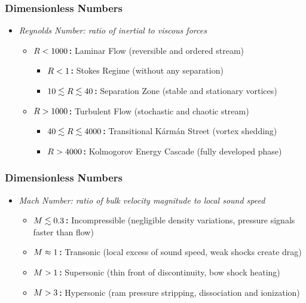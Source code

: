 	\begin{frame}
		\frametitle{Dimensionless Numbers}
		\begin{itemize}
			\item<2-> \itshape{Reynolds Number:} ratio of inertial to viscous forces
					  \visible<3->{$$R = \frac{\rho u L}{\eta} = \frac{u L}{\nu}$$\\[-1ex]}
			\begin{itemize}
				\item<3-> $R < 1000\kern+1pt${\bfseries{:}} Laminar Flow (reversible and ordered stream)
				\begin{itemize}
					\item<4-> $R < 1\kern+1pt${\bfseries{:}} Stokes Regime (without any separation)
					\item<5-> $10 \lesssim R \lesssim 40\kern+1pt${\bfseries{:}} Separation Zone (stable and stationary vortices)
				\end{itemize}
				\item<6-> $R > 1000\kern+1pt${\bfseries{:}} Turbulent Flow (stochastic and chaotic stream)
				\begin{itemize}
					\item<7-> $40 \lesssim R \lesssim 4000\kern+1pt${\bfseries{:}} Transitional Kármán Street (vortex shedding)
					\item<8-> $R > 4000\kern+1pt${\bfseries{:}} Kolmogorov Energy Cascade (fully developed phase)
				\end{itemize}
			\end{itemize}
		\end{itemize}
	\end{frame}

	\begin{frame}[noframenumbering]
		\frametitle{Dimensionless Numbers}
		\begin{itemize}
			\item<1-> \itshape{Mach Number:} ratio of bulk velocity magnitude to local sound speed
					  \visible<2->{$$M = \frac{u}{c}$$\\[-1ex]}
			\begin{itemize}
				\item<3-> $M \lesssim 0.3\kern+1pt${\bfseries{:}} Incompressible (negligible density variations, pressure signals faster than flow)
				\item<4-> $M \approx 1\kern+1pt${\bfseries{:}} Transonic (local excess of sound speed, weak shocks create drag)
				\item<5-> $M > 1\kern+1pt${\bfseries{:}} Supersonic (thin front of discontinuity, bow shock heating)
				\item<6-> $M > 3\kern+1pt${\bfseries{:}} Hypersonic (ram pressure stripping, dissociation and ionization)
			\end{itemize}
		\end{itemize}
	\end{frame}


